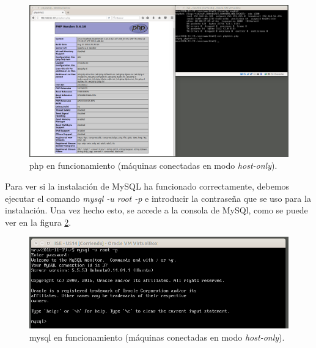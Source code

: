 \documentclass[a4paper,titlepage,12pt]{scrartcl}	%
\numberwithin{figure}{section} %
\numberwithin{table}{section} %
\begin{document}
	\begin{figure}[H]
		\includegraphics[width=\linewidth]{./Imagenes/9-php-ubuntuserver.png}
		\vspace{-0.5cm}
		\caption[php en funcionamiento (máquinas conectadas en modo \textit{host-only}).]{php en funcionamiento (máquinas conectadas en modo \textit{host-only}).}
		\label{9-php-ubuntuserver}
	\end{figure}
	
	Para ver si la instalación de MySQL ha funcionado correctamente, debemos ejecutar el comando \textit{mysql -u root -p} e introducir la contraseña que se uso para la instalación. Una vez hecho esto, se accede a la consola de MySQl, como se puede ver en la figura \ref{9-mysql-ubuntuserver}.
		
	\begin{figure}[H]
		\includegraphics[width=\linewidth]{./Imagenes/9-mysql-ubuntuserver.png}
		\vspace{-0.5cm}
		\caption[mysql en funcionamiento (máquinas conectadas en modo \textit{host-only}).]{mysql en funcionamiento (máquinas conectadas en modo \textit{host-only}).}
		\label{9-mysql-ubuntuserver}
	\end{figure}
	
\end{document}
